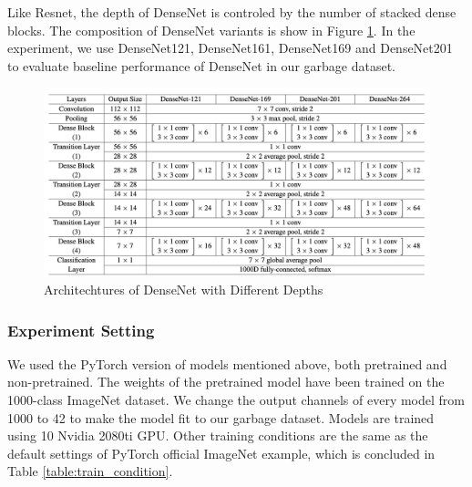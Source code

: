 Like Resnet, the depth of DenseNet is controled by the number of stacked dense blocks. The composition of DenseNet variants is show in Figure \ref{fig:dense_arch}. In the experiment, we use DenseNet121, DenseNet161, DenseNet169 and DenseNet201 to evaluate baseline performance of DenseNet in our garbage dataset.


\begin{figure}[ht]
	\centering
	\includegraphics[width=\linewidth]{figs/dense_arch.png}
	\caption{Architechtures of DenseNet with Different Depths\cite{densenet2017}}
	\label{fig:dense_arch}
\end{figure}

\subsubsection{Experiment Setting}
We used the PyTorch version of models mentioned above, both pretrained and non-pretrained. The weights of the pretrained model have been trained on the 1000-class ImageNet dataset. We change the output channels of every model from 1000 to 42 to make the model fit to our garbage dataset. Models are trained using 10 Nvidia 2080ti GPU. Other training conditions are the same as the default settings of PyTorch official ImageNet example, which is concluded in Table \ref{table:train_condition}.
